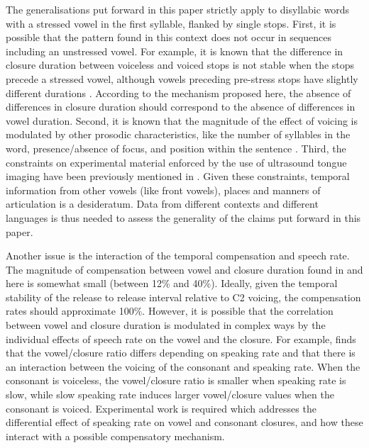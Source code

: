 \documentclass[charis]{glossa}
\begin{document}
The generalisations put forward in this paper strictly apply to
disyllabic words with a stressed vowel in the first syllable, flanked by
single stops. First, it is possible that the pattern found in this
context does not occur in sequences including an unstressed vowel. For
example, it is known that the difference in closure duration between
voiceless and voiced stops is not stable when the stops precede a
stressed vowel, although vowels preceding pre-stress stops have slightly
different durations \citep{davis1989}. According to the mechanism
proposed here, the absence of differences in closure duration should
correspond to the absence of differences in vowel duration. Second, it
is known that the magnitude of the effect of voicing is modulated by
other prosodic characteristics, like the number of syllables in the
word, presence/absence of focus, and position within the sentence
\citep{sharf1962, klatt1973, laeufer1992, de-jong2004}. Third, the
constraints on experimental material enforced by the use of ultrasound
tongue imaging have been previously mentioned in .
Given these constraints, temporal information from other vowels (like
front vowels), places and manners of articulation is a desideratum. Data
from different contexts and different languages is thus needed to assess
the generality of the claims put forward in this paper.

Another issue is the interaction of the temporal compensation and speech
rate. The magnitude of compensation between vowel and closure duration
found in \citet{de-jong1991} and here is somewhat small (between 12\%
and 40\%). Ideally, given the temporal stability of the release to
release interval relative to C2 voicing, the compensation rates should
approximate 100\%. However, it is possible that the correlation between
vowel and closure duration is modulated in complex ways by the
individual effects of speech rate on the vowel and the closure. For
example, \citet{ko2018} finds that the vowel/closure ratio differs
depending on speaking rate and that there is an interaction between the
voicing of the consonant and speaking rate. When the consonant is
voiceless, the vowel/closure ratio is smaller when speaking rate is
slow, while slow speaking rate induces larger vowel/closure values when
the consonant is voiced. Experimental work is required which addresses
the differential effect of speaking rate on vowel and consonant
closures, and how these interact with a possible compensatory mechanism.
\end{document}
